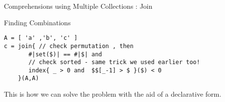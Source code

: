 \begin{section}{Comprehensions using Multiple Collections : Join}
\begin{subsection}{Finding Combinations}
\begin{lstlisting}[style=JexlStyle]
A = [ 'a' ,'b', 'c' ] 
c = join{ // check permutation , then 
       #|set($)| == #|$| and 
       // check sorted - same trick we used earlier too!      
       index{ _ > 0 and  $$[_-1] > $ }($) < 0 
    }(A,A)
\end{lstlisting}
This is how we can solve the problem with the aid of a declarative form. 
\end{subsection}

\end{section}



